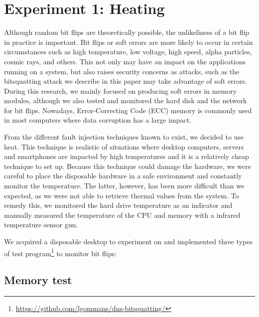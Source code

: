 \documentclass[conference]{IEEEtran}
\begin{document}
\section{Experiment 1: Heating}

Although random bit flips are theoretically possible, the unlikeliness of a bit
flip in practice is important. Bit flips or soft errors are more likely to
occur in certain circumstances such as high temperature, low voltage, high
speed, alpha particles, cosmic rays, and others. This not only may have an
impact on the applications running on a system, but also raises security
concerns as attacks, such as the bitsquatting attack we describe in this paper
may take advantage of soft errors. During this research, we mainly focused on
producing soft errors in memory modules, although we also tested and monitored
the hard disk and the network for bit flips. Nowadays, Error-Correcting Code
(ECC) memory is commonly used in most computers where data corruption has a
large impact.

From the different fault injection techniques known to
exist\cite{barenghi2012fault}, we decided to use heat. This technique is
realistic of situations where desktop computers, servers and smartphones are
impacted by high temperatures and it is a relatively cheap technique to set up.
Because this technique could damage the hardware, we were careful to place the
disposable hardware in a safe environment and constantly monitor the
temperature. The latter, however, has been more difficult than we expected, as
we were not able to retrieve thermal values from the system. To remedy this, we
monitored the hard drive temperature as an indicator and manually measured the
temperature of the CPU and memory with a infrared temperature sensor gun.

We acquired a disposable desktop to experiment on and implemented three types
of test program\footnote{\url{https://github.com/lgommans/dns-bitsquatting/}}
to monitor bit flips:

\subsection{Memory test}
\end{document}
